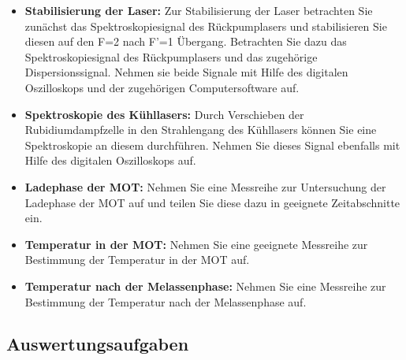 \documentclass[
class=book,
accentcolor=1b,
custommargins=geometry,
fontsize=11pt,
thesis={type=Versuchsanleitung},
ruledheaders=all,
headline=false,
instbox=false,
marginpar=false,
title=small,
ignore-missing-data=true,
twoside=false,
logofile=apqdesign/tuda_logo.pdf,
pdfa=false %
]{apqpub}
\begin{document}
\begin{itemize}
	
	\item \textbf{Stabilisierung der Laser:} Zur Stabilisierung der Laser betrachten Sie zunächst das Spektroskopiesignal des Rückpumplasers und stabilisieren Sie diesen auf den F=2 nach F'=1 Übergang. Betrachten Sie dazu das Spektroskopiesignal des Rückpumplasers und das zugehörige Dispersionssignal. Nehmen sie beide Signale mit Hilfe des digitalen Oszilloskops und der zugehörigen Computersoftware auf.
	
	\item \textbf{Spektroskopie des Kühllasers:} Durch Verschieben der Rubidiumdampfzelle in den Strahlengang des Kühllasers können Sie eine Spektroskopie an diesem durchführen. Nehmen Sie dieses Signal ebenfalls mit Hilfe des digitalen Oszilloskops auf.
	
	\item \textbf{Ladephase der MOT:} Nehmen Sie eine Messreihe zur Untersuchung der Ladephase der MOT auf und teilen Sie diese dazu in geeignete Zeitabschnitte ein.
	
	\item \textbf{Temperatur in der MOT:} Nehmen Sie eine geeignete Messreihe zur Bestimmung der Temperatur in der MOT auf.
	
	\item \textbf{Temperatur nach der Melassenphase:} Nehmen Sie eine Messreihe zur Bestimmung der Temperatur nach der Melassenphase auf.
	
\end{itemize}

\subsection{Auswertungsaufgaben}
\end{document}
